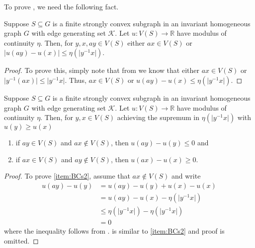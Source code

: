 To prove , we need the following fact.
\begin{lem}\label{prop:BCs}
 Suppose $S \subseteq G $ is a finite strongly convex subgraph in an invariant homogeneous graph $G$ with edge generating set $\mathcal{K}$. Let $u: V(S) \longrightarrow \mathbb{R}$ have modulus of continuity $\eta$. Then, for $y,x,ay \in V(S)$ either $ax \in V(S)$ or $\left\lvert u(ay)-u(x) \right\rvert \leq \eta\left(\lvert y^{-1}x \rvert \right)$.
 \end{lem}
 \begin{proof}
 	To prove this, simply note that from  we know that either $ax \in V(S)$ or $\lvert y^{-1}(ax) \rvert \leq \lvert y^{-1}x \rvert$. Thus, $ax \in V(S)$ or $u(ay)-u(x) \leq \eta(\lvert y^{-1} x \rvert)$.
 \end{proof}
 \begin{lem}\label{prop:BCs2}
 Suppose $S \subseteq G $ is a finite strongly convex subgraph in an invariant homogeneous graph $G$ with edge generating set $\mathcal{K}$. Let $u: V(S) \longrightarrow \mathbb{R}$ have modulus of continuity $\eta$. Then, for $y,x \in V(S)$ achieving the supremum in $\eta(\lvert y^{-1}x\rvert)$ with $u(y)\geq u(x)$
	\begin{enumerate}
		\item \label{item:BCs2} if $ay \in V(S)$ and $ax \notin V(S)$, then $u(ay)-u(y) \leq 0$ and
		\item \label{item:BCs3} if $ax \in V(S)$ and $ay \notin V(S)$, then $u(ax)-u(x) \geq 0$.
	\end{enumerate}
\end{lem}
\begin{proof}
 To prove \cref{item:BCs2}, assume that $ax \notin V(S)$ and write
 \begin{align*}
   	u(ay)-u(y) &= u(ay)-u(y) + u(x) - u(x) \\
   	&= u(ay) - u(x) -\eta(\lvert y^{-1} x \rvert) \\
   	&\leq \eta(\lvert y^{-1} x \rvert) - \eta(\lvert y^{-1} x \rvert) \\
   	&= 0
   \end{align*}
   where the inequality follows from .  is similar to \cref{item:BCs2} and proof is omitted. 
\end{proof}

